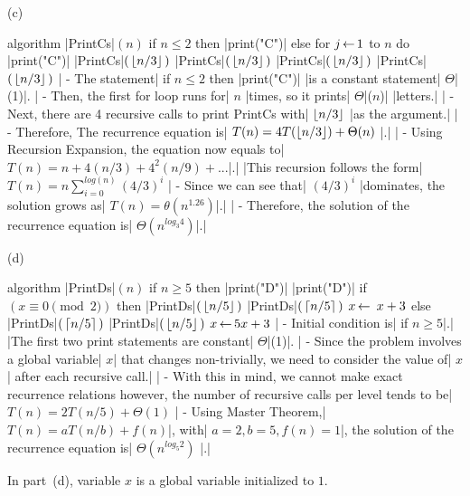 \documentclass{article}
\begin{document}
\begin{problem}
\medskip
\noindent
(c) 
\hspace{0.01in}
%
\begin{minipage}[t]{2.4in}
\strut\vspace*{- 2.5 \baselineskip}\newline 

\begin{program}
algorithm |PrintCs|$(n)$
   if $n\le 2$ then
      |print("C")|
   else
      for $j{\,\leftarrow\,} 1$ to $n$
         do |print("C")|
      |PrintCs|$(\,{\left\lfloor n/3\right\rfloor}\,)$
      |PrintCs|$(\,{\left\lfloor n/3\right\rfloor}\,)$
      |PrintCs|$(\,{\left\lfloor n/3\right\rfloor}\,)$
      |PrintCs|$(\,{\left\lfloor n/3\right\rfloor}\,)$
| - The statement| if $n\le 2$ then |print("C")| |is a constant statement| $\Theta$|(1)|.
| - Then, the first for loop runs for| $n$ |times, so it prints| $\Theta$|($n$)| |letters.|
| - Next, there are 4 recursive calls to print PrintCs with| ${\left\lfloor n/3\right\rfloor}$ |as the argument.|
| - Therefore, The recurrence equation is| $T(n) = 4T({\left\lfloor n/3\right\rfloor}) + \Theta(n)$ |.|
| - Using Recursion Expansion, the equation now equals to| $T(n)=n+4(n/3)+4^2(n/9)+...$|.| |This recursion follows the form| $T(n)=n\sum_{i=0}^{log(n)}(4/3)^i$
| - Since we can see that| $(4/3)^i$ |dominates, the solution grows as| $T(n)=\theta(n^{1.26})$|.|
| - Therefore, the solution of the recurrence equation is| $\Theta(n^{log_3 4})$|.|
\end{program}
\end{minipage}
%
\hspace{0.4in}
(d) 
\hspace{0.01in}
%
\begin{minipage}[t]{2.4in}
\strut\vspace*{- 2.5 \baselineskip}\newline 

\begin{program}
algorithm |PrintDs|$(n)$  
   if $n\ge 5$ then
      |print("D")|
      |print("D")|
     if $(x \equiv 0 \pmod 2)$ then 
         |PrintDs|$(\,{\left\lfloor n/5\right\rfloor}\,)$
         |PrintDs|$(\,{\left\lceil n/5\right\rceil}\,)$
         $x{\,\leftarrow\,} \ x + 3$
      else
         |PrintDs|$(\,{\left\lceil n/5\right\rceil}\,)$
         |PrintDs|$(\,{\left\lfloor n/5\right\rfloor}\,)$
         $x{\,\leftarrow\,} 5x + 3$
| - Initial condition is| if $n\ge5$|.| |The first two print statements are constant| $\Theta$|(1)|.
| - Since the problem involves a global variable| $x$| that changes non-trivially, we need to consider the value of| $x$| after each recursive call.|
| - With this in mind, we cannot make exact recurrence relations however, the number of recursive calls per level tends to be| $T(n)=2T(n/5)+\Theta(1)$
| - Using Master Theorem,| $T(n)=aT(n/b)+f(n)$|, with| $a=2, b=5, f(n)=1$|, the solution of the recurrence equation is| $\Theta(n^{log_5 2})$ |.|
\end{program}
\end{minipage}

\noindent
In part~(d), variable $x$ is a global variable initialized to $1$.
\end{problem}
\end{document}
